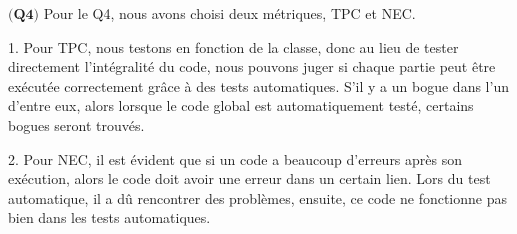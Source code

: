 \documentclass{article}
\begin{document}
\item$\textbf{(Q4)}$
Pour le Q4, nous avons choisi deux métriques, TPC et NEC.

1. Pour TPC, nous testons en fonction de la classe, donc au lieu de tester directement l'intégralité du code, nous pouvons juger si chaque partie peut être exécutée correctement grâce à des tests automatiques. S'il y a un bogue dans l'un d'entre eux, alors lorsque le code global est automatiquement testé, certains bogues seront trouvés.

2. Pour NEC, il est évident que si un code a beaucoup d'erreurs après son exécution, alors le code doit avoir une erreur dans un certain lien. Lors du test automatique, il a dû rencontrer des problèmes, ensuite, ce code ne fonctionne pas bien dans les tests automatiques.
\end{document}
